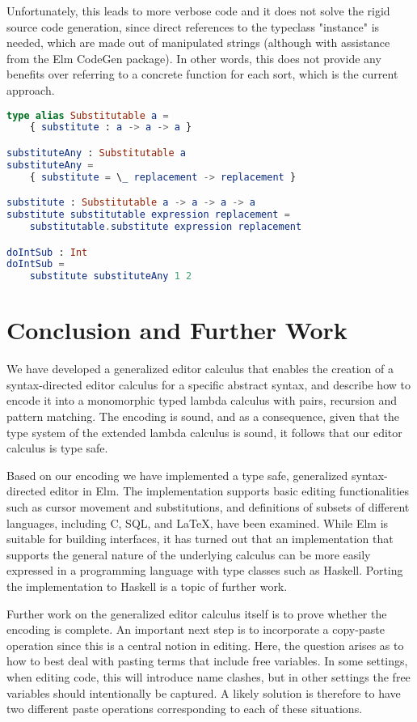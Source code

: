 \documentclass[sigplan,review]{acmart}
\begin{document}
Unfortunately, this leads to more verbose code and it does not solve the rigid source code generation, since direct references to the typeclass "instance" is needed, which are made out of manipulated strings (although with assistance from the Elm CodeGen package). In other words, this
does not provide any benefits over referring to a concrete function for
each sort, which is the current approach.

\begin{lstlisting}[language=elm,style=inline,caption={Elm typeclass simulation example},label={lst:elm-typeclass}]
type alias Substitutable a =
    { substitute : a -> a -> a }

substituteAny : Substitutable a
substituteAny =
    { substitute = \_ replacement -> replacement }

substitute : Substitutable a -> a -> a -> a
substitute substitutable expression replacement =
    substitutable.substitute expression replacement

doIntSub : Int
doIntSub =
    substitute substituteAny 1 2
\end{lstlisting}


\section{Conclusion and Further Work}

We have developed a generalized editor calculus that enables the
creation of a syntax-directed editor calculus for a specific abstract
syntax, and describe how to encode it into a monomorphic typed lambda
calculus with pairs, recursion and pattern matching. The encoding is
sound, and as a consequence, given that the type system of the
extended lambda calculus is sound, it follows that our editor calculus
is type safe.

Based on our encoding we have implemented a type safe, generalized
syntax-directed editor in Elm.  The implementation supports basic editing
functionalities such as cursor movement and substitutions, and
definitions of subsets of different languages, including C, SQL, and
\LaTeX, have been examined. While Elm is suitable for building
interfaces, it has turned out that an implementation that supports the
general nature of the underlying calculus can be more easily expressed
in a programming language with type classes such as Haskell. Porting
the implementation to Haskell is a topic of further work.

Further work on the generalized editor calculus itself is to prove whether
the encoding is complete.  An important next step is to
incorporate a copy-paste operation since this is a central notion in
editing. Here, the question arises as to how to best deal with pasting
terms that include free variables. In some settings, when editing
code, this will introduce name clashes, but in other settings the free
variables should intentionally be captured. A likely solution is
therefore to have two different paste operations corresponding to each
of these situations.



\end{document}
